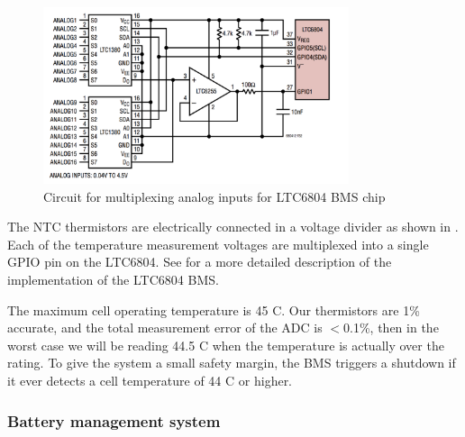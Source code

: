 \documentclass{article}
\begin{document}
\begin{figure}[H]
    \centering
    \includegraphics[width=0.8\textwidth]{mux_circuit}
    \caption{Circuit for multiplexing analog inputs for LTC6804 BMS chip}
    \label{fig:mux_circuit}
\end{figure}

The NTC thermistors are electrically connected in a voltage divider as shown in . Each of the temperature measurement voltages are multiplexed into a single GPIO pin on the LTC6804. See  for a more detailed description of the implementation of the LTC6804 BMS. 

The maximum cell operating temperature is 45 \textdegree C. Our thermistors are 1\% accurate, and the total measurement error of the ADC is $<$0.1\%, then in the worst case we will be reading 44.5 \textdegree C when the temperature is actually over the rating. To give the system a small safety margin, the BMS triggers a shutdown if it ever detects a cell temperature of 44 \textdegree C or higher. 


\subsubsection{Battery management system}\label{sec:accumulator_battery_management_system}
\end{document}
